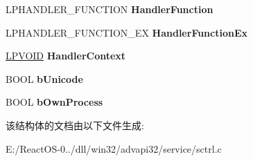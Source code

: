 \begin{DoxyCompactItemize}
\begin{tabbing}
\end{tabbing}\item 
\mbox{\label{struct___a_c_t_i_v_e___s_e_r_v_i_c_e_adc96ae34cb5974822628f30372b438fb}} 
L\+P\+H\+A\+N\+D\+L\+E\+R\+\_\+\+F\+U\+N\+C\+T\+I\+ON {\bfseries Handler\+Function}
\item 
\mbox{\label{struct___a_c_t_i_v_e___s_e_r_v_i_c_e_a42916d8246e1187241a86baff6ca5675}} 
L\+P\+H\+A\+N\+D\+L\+E\+R\+\_\+\+F\+U\+N\+C\+T\+I\+O\+N\+\_\+\+EX {\bfseries Handler\+Function\+Ex}
\item 
\mbox{\label{struct___a_c_t_i_v_e___s_e_r_v_i_c_e_a41053994032d5975eb414cd36c58e5aa}} 
\hyperlink{interfacevoid}{L\+P\+V\+O\+ID} {\bfseries Handler\+Context}
\item 
\mbox{\label{struct___a_c_t_i_v_e___s_e_r_v_i_c_e_a99ec2423fa7383b0ee21bbe38781626f}} 
B\+O\+OL {\bfseries b\+Unicode}
\item 
\mbox{\label{struct___a_c_t_i_v_e___s_e_r_v_i_c_e_a156c9703fb84492da5856252b27b9647}} 
B\+O\+OL {\bfseries b\+Own\+Process}
\end{DoxyCompactItemize}


该结构体的文档由以下文件生成\+:\begin{DoxyCompactItemize}
\item 
E\+:/\+React\+O\+S-\/0../dll/win32/advapi32/service/sctrl.\+c\end{DoxyCompactItemize}
